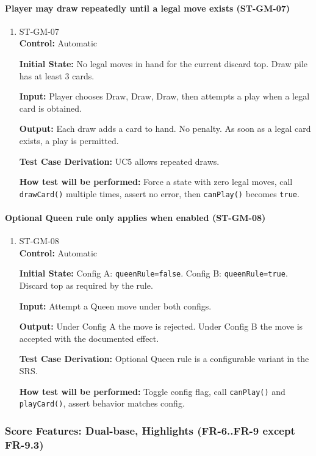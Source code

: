 \documentclass[12pt, titlepage]{article}
\begin{document}
\paragraph{Player may draw repeatedly until a legal move exists (ST-GM-07)}
\begin{enumerate}
\item{ST-GM-07\\}
\textbf{Control:} Automatic

\textbf{Initial State:} No legal moves in hand for the current discard top. Draw pile has at least 3 cards.

\textbf{Input:} Player chooses Draw, Draw, Draw, then attempts a play when a legal card is obtained.

\textbf{Output:} Each draw adds a card to hand. No penalty. As soon as a legal card exists, a play is permitted.

\textbf{Test Case Derivation:} UC5 allows repeated draws.

\textbf{How test will be performed:} Force a state with zero legal moves, call \texttt{drawCard()} multiple times, assert no error, then \texttt{canPlay()} becomes \texttt{true}.
\end{enumerate}

\paragraph{Optional Queen rule only applies when enabled (ST-GM-08)}
\begin{enumerate}
\item{ST-GM-08\\}
\textbf{Control:} Automatic

\textbf{Initial State:} Config A: \texttt{queenRule=false}. Config B: \texttt{queenRule=true}. Discard top as required by the rule.

\textbf{Input:} Attempt a Queen move under both configs.

\textbf{Output:} Under Config A the move is rejected. Under Config B the move is accepted with the documented effect.

\textbf{Test Case Derivation:} Optional Queen rule is a configurable variant in the SRS.

\textbf{How test will be performed:} Toggle config flag, call \texttt{canPlay()} and \texttt{playCard()}, assert behavior matches config.
\end{enumerate}

\subsubsection{Score Features: Dual-base, Highlights (FR-6..FR-9 except FR-9.3)}
\end{document}
